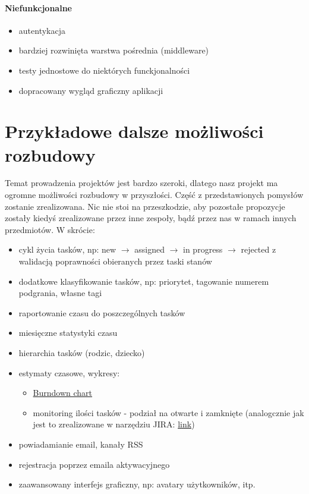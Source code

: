 \documentclass[a4paper,12pt,notitlepage]{mwrep}
\begin{document}
\paragraph{Niefunkcjonalne}
\begin{itemize}
	\item	autentykacja
	\item	bardziej rozwinięta warstwa pośrednia (middleware)
	\item	testy jednostowe do niektórych funckjonalności
	\item	dopracowany wygląd graficzny aplikacji
\end{itemize}




\section{Przykładowe dalsze możliwości rozbudowy}
Temat prowadzenia projektów jest bardzo szeroki, dlatego nasz projekt ma ogromne możliwości
rozbudowy w przyszłości. Część z przedstawionych pomysłów zostanie zrealizowana.
Nic nie stoi na przeszkodzie, aby pozostałe propozycje zostały kiedyś zrealizowane przez
inne zespoły, bądź przez nas w ramach innych przedmiotów. W skrócie:
\begin{itemize}
	\item	cykl życia tasków, np: new $\rightarrow$ assigned $\rightarrow$ in progress $\rightarrow$ rejected
			z walidacją poprawności obieranych przez taski stanów
	\item	dodatkowe klasyfikowanie tasków, np: priorytet, tagowanie numerem podgrania, własne tagi
	\item	raportowanie czasu do poszczególnych tasków
	\item	miesięczne statystyki czasu
	\item	hierarchia tasków (rodzic, dziecko)
	\item	estymaty czasowe, wykresy:
			\begin{itemize}
				\item	\href{http://www.youtube.com/watch?v=XU0llRltyFM&t=4m29s}{Burndown chart}
				\item	monitoring ilości tasków - podział na otwarte i zamknięte (analogcznie jak jest to zrealizowane w narzędziu JIRA:
						\href{https://confluence.atlassian.com/download/attachments/185729486/gadgets-charting-created-vs-resolved.png?version=2&modificationDate=1350347163816&api=v2}{link})
			\end{itemize}
	\item	powiadamianie email, kanały RSS
	\item	rejestracja poprzez emaila aktywacyjnego
	\item	zaawansowany interfejs graficzny, np: avatary użytkowników, itp.
\end{itemize}
\end{document}
